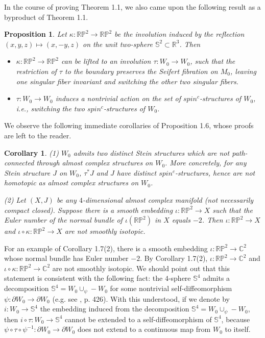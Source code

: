 \documentclass[11pt]{amsart}
\theoremstyle{plain}
\numberwithin{theorem}{section}
\newtheorem{proposition}[theorem]{Proposition}
\newtheorem{corollary}[theorem]{Corollary}
\theoremstyle{definition}
\newcommand{\C}{{\mathbb C}}
\newcommand{\R}{{\mathbb R}}
\renewcommand{\P}{{\mathbb P}}
\newcommand{\s}{{\mathbb S}}
\begin{document}
In the course of proving Theorem 1.1, we also came upon the following result as a byproduct of Theorem 1.1. 

\begin{proposition}
Let $\kappa:\R\P^2\rightarrow \R\P^2$ be the involution induced by the reflection $(x,y,z)\mapsto (x,-y,z)$ on the unit two-sphere $\s^2\subset \R^3$. Then 
\begin{itemize}
\item [{(1)}] $\kappa: \R\P^2\rightarrow \R\P^2$ can be lifted to an involution $\tau: W_0\rightarrow W_0$, such that
the restriction of $\tau$ to the boundary preserves the Seifert fibration on $M_0$, leaving one singular fiber invariant and switching the other two singular fibers. 
\item [{(2)}] $\tau: W_0\rightarrow W_0$ induces a nontrivial action on the set of $spin^c$-structures of $W_0$, i.e., switching the two $spin^c$-structures of $W_0$. 
\end{itemize}
\end{proposition}

We observe the following immediate corollaries of Proposition 1.6, whose proofs are left to the reader. 

\begin{corollary}
(1) $W_0$ admits two distinct Stein structures which are not path-connected through almost complex structures on $W_0$. More concretely, for any Stein structure $J$ on $W_0$, $\tau^\ast J$ and $J$ have distinct $spin^c$-structures, hence are not homotopic as almost complex structures on $W_0$. 

(2) Let $(X,J)$ be any $4$-dimensional almost complex manifold (not necessarily compact closed). Suppose there is a smooth embedding $\iota: \R\P^2\rightarrow X$ such that the Euler number of the normal bundle of $\iota(\R\P^2)$ in $X$ equals $-2$. Then $\iota: \R\P^2\rightarrow X$ and $\iota\circ \kappa: \R\P^2\rightarrow X$ are not smoothly isotopic. 
\end{corollary}

For an example of Corollary 1.7(2), there is a smooth embedding $\iota: \R\P^2\rightarrow \C^2$ whose normal bundle has Euler number $-2$. By Corollary 1.7(2),  $\iota: \R\P^2\rightarrow \C^2$ and $\iota\circ \kappa:  \R\P^2\rightarrow \C^2$ are not smoothly isotopic. We should point out that this statement is consistent with the following fact: the $4$-sphere $\s^4$ admits a decomposition $\s^4=W_0\cup_\psi -W_0$ for some nontrivial self-diffeomorphism $\psi: \partial W_0\rightarrow \partial W_0$ (e.g. see \cite{A}, p. 426). With this understood, if we denote by $i: W_0\rightarrow \s^4$ the embedding induced from the decomposition 
$\s^4=W_0\cup_\psi -W_0$, then $i\circ \tau: W_0\rightarrow \s^4$ cannot be extended to a self-diffeomorphism of $\s^4$, because $\psi\circ \tau\circ \psi^{-1}: \partial W_0\rightarrow \partial W_0$ does not extend to a continuous map from $W_0$ to itself. 
\end{document}

